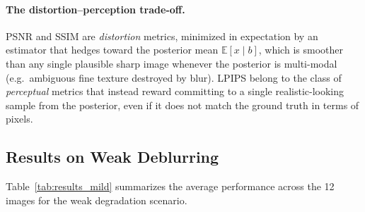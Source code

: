 \documentclass[12pt, a4paper, onecolumn]{article}
\theoremstyle{plain}          %
\theoremstyle{definition}     %
\theoremstyle{remark}
\begin{document}
\paragraph{The distortion--perception trade-off.} PSNR and SSIM are \emph{distortion} metrics, minimized in expectation by an estimator that hedges toward the posterior mean $\mathbb E[x\mid b]$, which is smoother than any single plausible sharp image whenever the posterior is multi-modal (e.g.\ ambiguous fine texture destroyed by blur). LPIPS belong to the class of \emph{perceptual} metrics that instead reward committing to a single realistic-looking sample from the posterior, even if it does not match the ground truth in terms of pixels. 

\subsection{Results on Weak Deblurring}
\label{sec:results_mild}

Table~\ref{tab:results_mild} summarizes the average performance across the 12 images for the weak degradation scenario.
\end{document}
